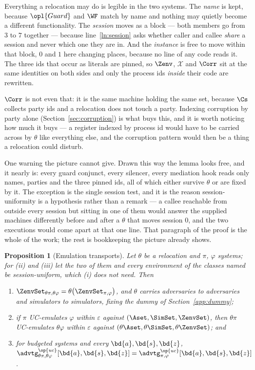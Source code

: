 \documentclass[10pt,oneside,openany]{book}
\theoremstyle{accentdef}
\theoremstyle{accentplain}
\newtheorem{proposition}[definition]{Proposition}
\begin{document}
Everything a relocation may do is legible in the two systems. The \emph{name} is kept, because
$\opl{Guard}$ and $\WF$ match by name and nothing may quietly become a different functionality.
The \emph{session} moves as a block --- both members go from $3$ to $7$ together --- because
line~\ref{ln:session} asks whether caller and callee \emph{share} a session and never which one
they are in. And the \emph{instance} is free to move within that block, $0$ and $1$ here changing
places, because no line of any code reads it. The three ids that occur as literals are pinned, so
$\Zenv$, $\mathcal{X}$ and $\Corr$ sit at the same identities on both sides and only the process
ids \emph{inside} their code are rewritten.

$\Corr$ is not even that: it is the same machine holding the same set, because $\Cs$ collects
party ids and a relocation does not touch a party. Indexing corruption by party alone
(Section~\ref{sec:corruption}) is what buys this, and it is worth noticing how much it buys --- a
register indexed by process id would have to be carried across by $\theta$ like everything else,
and the corruption pattern would then be a thing a relocation could disturb.

One warning the picture cannot give. Drawn this way the lemma looks free, and it nearly is: every
guard conjunct, every silencer, every mediation hook reads only names, parties and the three
pinned ids, all of which either survive $\theta$ or are fixed by it. The exception is the single
session test, and it is the reason session-uniformity is a hypothesis rather than a remark --- a
callee reachable from outside every session but sitting in one of them would answer the supplied
machines differently before and after a $\theta$ that moves session $0$, and the two executions
would come apart at that one line. That paragraph of the proof is the whole of the work; the rest
is bookkeeping the picture already shows.

\begin{proposition}[Emulation transports]\label{prop:relocemul}
Let $\theta$ be a relocation and $\pi$, $\varphi$ systems; for (ii) and (iii) let the two of them and
every environment of the classes named be session-uniform, which (i) does not need. Then
\begin{enumerate}[label=(\roman*),leftmargin=2.2em]
  \item $\ZenvSet_{\theta\pi,\theta\varphi} = \theta\bigl(\ZenvSet_{\pi,\varphi}\bigr)$, and
        $\theta$ carries adversaries to adversaries and simulators to simulators, fixing the dummy
        of Section~\ref{app:dummy};
  \item if $\pi$ UC-emulates $\varphi$ within $\varepsilon$ against
        $(\Aset,\SimSet,\ZenvSet)$, then $\theta\pi$ UC-emulates $\theta\varphi$ within
        $\varepsilon$ against $(\theta\Aset,\theta\SimSet,\theta\ZenvSet)$; and
  \item for budgeted systems and every $\bd{a},\bd{s},\bd{z}$,
        $\advtg^{\op{uc}}_{\theta\pi,\theta\varphi}[\bd{a},\bd{s},\bd{z}]
         = \advtg^{\op{uc}}_{\pi,\varphi}[\bd{a},\bd{s},\bd{z}]$.
\end{enumerate}
\end{proposition}
\end{document}
